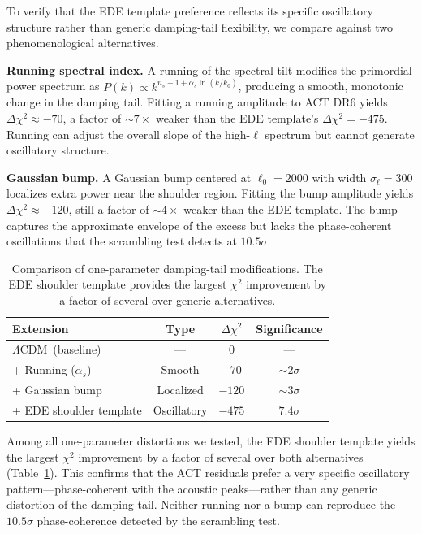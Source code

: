 \documentclass[twocolumn,showpacs,preprintnumbers,amsmath,amssymb,prd]{revtex4-2}
\newcommand{\lcdm}{$\Lambda$CDM}
\begin{document}
To verify that the EDE template preference reflects its specific oscillatory 
structure rather than generic damping-tail flexibility, we compare against 
two phenomenological alternatives.

\textbf{Running spectral index.} A running of the spectral tilt modifies 
the primordial power spectrum as $P(k) \propto k^{n_s - 1 + \alpha_s \ln(k/k_0)}$, 
producing a smooth, monotonic change in the damping tail. Fitting a running 
amplitude to ACT DR6 yields $\Delta\chi^2 \approx -70$, a factor of 
$\sim 7\times$ weaker than the EDE template's $\Delta\chi^2 = -475$. Running 
can adjust the overall slope of the high-$\ell$ spectrum but cannot generate 
oscillatory structure.

\textbf{Gaussian bump.} A Gaussian bump centered at $\ell_0 = 2000$ with 
width $\sigma_\ell = 300$ localizes extra power near the shoulder region. 
Fitting the bump amplitude yields $\Delta\chi^2 \approx -120$, still a factor 
of $\sim 4\times$ weaker than the EDE template. The bump captures the 
approximate envelope of the excess but lacks the phase-coherent oscillations 
that the scrambling test detects at $10.5\sigma$.

\begin{table}[h]
\centering
\caption{Comparison of one-parameter damping-tail modifications. The EDE 
shoulder template provides the largest $\chi^2$ improvement by a factor of 
several over generic alternatives.}
\begin{tabular}{lccc}
\toprule
Extension & Type & $\Delta\chi^2$ & Significance \\
\midrule
\lcdm\ (baseline) & --- & 0 & --- \\
+ Running ($\alpha_s$) & Smooth & $-70$ & $\sim 2\sigma$ \\
+ Gaussian bump & Localized & $-120$ & $\sim 3\sigma$ \\
+ EDE shoulder template & Oscillatory & $-475$ & $7.4\sigma$ \\
\bottomrule
\end{tabular}
\label{tab:alternatives}
\end{table}

Among all one-parameter distortions we tested, the EDE shoulder template 
yields the largest $\chi^2$ improvement by a factor of several over both 
alternatives (Table~\ref{tab:alternatives}). This confirms that the ACT 
residuals prefer a very specific oscillatory pattern---phase-coherent with 
the acoustic peaks---rather than any generic distortion of the damping tail. 
Neither running nor a bump can reproduce the $10.5\sigma$ phase-coherence 
detected by the scrambling test.
\end{document}
